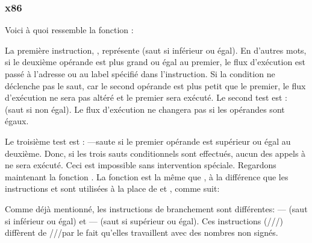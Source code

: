 \subsubsection{x86}


Voici à quoi ressemble la fonction  :




La première instruction, \JLE, représente  (saut si inférieur ou égal).
En d'autres mots, si le deuxième opérande est plus grand ou égal au premier,
le flux d'exécution est passé à l'adresse ou au label spécifié dans l'instruction.
Si la condition ne déclenche pas le saut, car le second opérande est plus petit que
le premier, le flux d'exécution ne sera pas altéré et le premier \printf sera
exécuté.
Le second test est \JNE:  (saut si non égal).
Le flux d'exécution ne changera pas si les opérandes sont égaux.

Le troisième test est \JGE: ---saute si le premier
opérande est supérieur ou égal au deuxième.
Donc, si les trois sauts conditionnels sont effectués, aucun des appels à \printf
ne sera exécuté.
Ceci est impossible sans intervention spéciale.
Regardons maintenant la fonction .
La fonction  est la même que , à la différence
que les instructions \JBE et \JAE sont utilisées à la place de \JLE et \JGE, comme
suit:




Comme déjà mentionné, les instructions de branchement sont différentes:
\JBE--- (saut si inférieur ou égal) et \JAE---
(saut si supérieur ou égal).
Ces instructions (\JA/\JAE/\JB/\JBE) diffèrent de \JG/\JGE/\JL/\JLE par le fait qu'elles
travaillent avec des nombres non signés.


